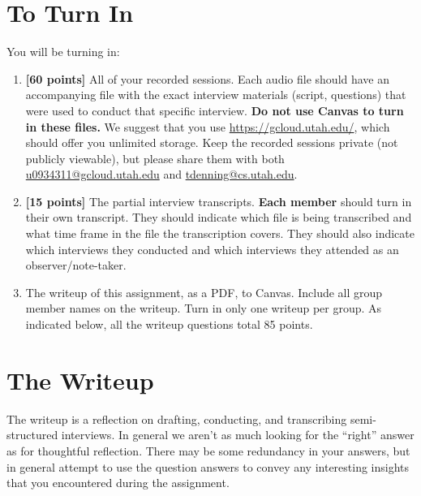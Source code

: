 \documentclass{article}
\begin{document}
\section{To Turn In}
You will be turning in:
\begin{enumerate}
    \item \textbf{[60 points]} All of your recorded sessions. Each audio file should have an accompanying file with the exact interview materials (script, questions) that were used to conduct that specific interview. \textbf{Do not use Canvas to turn in these files.} We suggest that you use \href{https://gcloud.utah.edu/}{https://gcloud.utah.edu/}, which should offer you unlimited storage. Keep the recorded sessions private (not publicly viewable), but please share them with both \href{mailto:u0934311@gcloud.utah.edu}{u0934311@gcloud.utah.edu} and \href{mailto:tdenning@cs.utah.edu}{tdenning@cs.utah.edu}.
    \item \textbf{[15 points]} The partial interview transcripts. \textbf{Each member} should turn in their own transcript. They should indicate which file is being transcribed and what time frame in the file the transcription covers. They should also indicate which interviews they conducted and which interviews they attended as an observer/note-taker. 
    \item The writeup of this assignment, as a PDF, to Canvas. Include all group member names on the writeup. Turn in only one writeup per group. As indicated below, all the writeup questions total 85 points.
    
\end{enumerate}

\section{The Writeup}
The writeup is a reflection on drafting, conducting, and transcribing semi-structured interviews. In general we aren't as much looking for the ``right'' answer as for thoughtful reflection. There may be some redundancy in your answers, but in general attempt to use the question answers to convey any interesting insights that you encountered during the assignment.
\end{document}
